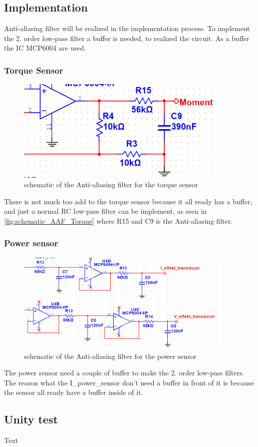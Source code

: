 \subsection{Implementation}

	Anti-aliasing filter will be realized in the implementation process. To implement the 2. order low-pass filter a buffer is needed, to realized the circuit. As a buffer the IC MCP6004 are used.
	
	\subsubsection*{Torque Sensor}
	
	\begin{figure}[H]
		\centering
		\includegraphics [width=4in]{Hardware/Pictures/AAF_moment.PNG}
		\caption{schematic of the Anti-aliasing filter for the torque sensor}
		\label{fig:schematic_AAF_Torque}
	\end{figure}
	
	There is not much too add to the torque sensor because it all ready has a buffer, and just a normal RC low-pass filter can be implement, as seen in \vref{fig:schematic_AAF_Torque} where R15 and C9 is the Anti-aliasing filter.
	
	
	\subsubsection*{Power sensor}

	\begin{figure}[H]
		\centering
		\includegraphics [width=4in]{Hardware/Pictures/AAF_effekt.PNG}
		\caption{schematic of the Anti-aliasing filter for the power sensor}
		\label{fig:schematic_AAF_power}
	\end{figure}
	
	The power sensor need a couple of buffer to make the 2. order low-pass filters. The reason what the I\_power\_sensor don't need a buffer in front of it is because the sensor all ready have a buffer inside of it.   

\subsection{Unity test}
Text 